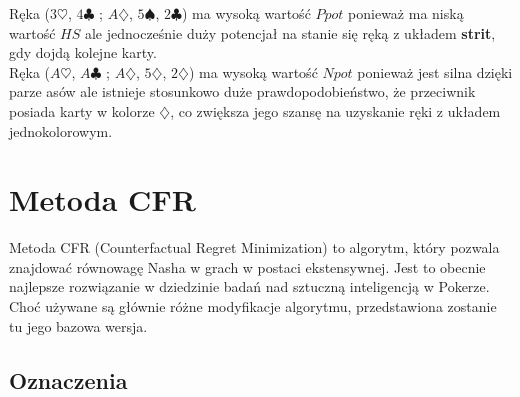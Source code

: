 \documentclass[licencjacka]{pracamgr}
\begin{document}
\noindent
Ręka ($3\heartsuit$, $4\clubsuit$ ; $A\diamondsuit$, $5\spadesuit$, $2\clubsuit$) ma wysoką wartość $Ppot$ ponieważ ma niską wartość $HS$
ale jednocześnie duży potencjał na stanie się ręką z układem \textbf{strit}, gdy dojdą kolejne karty. \\

\noindent
Ręka ($A\heartsuit$, $A\clubsuit$ ; $A\diamondsuit$, $5\diamondsuit$, $2\diamondsuit$) ma wysoką wartość $Npot$ ponieważ jest silna
dzięki parze asów ale istnieje stosunkowo duże prawdopodobieństwo, że przeciwnik posiada karty w kolorze $\diamondsuit$, co zwiększa jego szansę
na uzyskanie ręki z układem jednokolorowym.


\chapter{Metoda CFR}

Metoda CFR (Counterfactual Regret Minimization) to algorytm, który pozwala znajdować równowagę Nasha
w grach w postaci ekstensywnej. Jest to obecnie najlepsze rozwiązanie w dziedzinie badań nad
sztuczną inteligencją w Pokerze. Choć używane są głównie różne modyfikacje algorytmu,
przedstawiona zostanie tu jego bazowa wersja.

\section{Oznaczenia}
\end{document}
